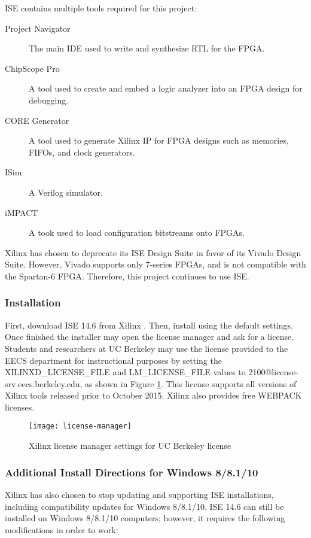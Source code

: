 ISE contains multiple tools required for this project:
\begin{description}
	\item[Project Navigator] The main IDE used to write and synthesize RTL for the FPGA.
	\item[ChipScope Pro] A tool used to create and embed a logic analyzer into an FPGA design for debugging.
	\item[CORE Generator] A tool used to generate Xilinx IP for FPGA designs such as memories, FIFOs, and clock generators.
	\item[ISim] A Verilog simulator.
	\item[iMPACT] A took used to load configuration bitstreams onto FPGAs.
\end{description}

Xilinx has chosen to deprecate its ISE Design Suite in favor of its Vivado Design Suite. However, Vivado supports only 7-series FPGAs, and is not compatible with the Spartan-6 FPGA. Therefore, this project continues to use ISE.

\subsubsection{Installation}
First, download ISE 14.6 from Xilinx \cite{ise-download}. Then, install using the default settings. Once finished the installer may open the license manager and ask for a license. Students and researchers at UC Berkeley may use the license provided to the EECS department for instructional purposes by setting the XILINXD\_LICENSE\_FILE and LM\_LICENSE\_FILE values to 2100@license-srv.eecs.berkeley.edu, as shown in Figure \ref{fig:license-manager}. This license supports all versions of Xilinx tools released prior to October 2015. Xilinx also provides free WEBPACK licenses. %

\begin{figure}
\centering
\texttt{[image: license-manager]}
\caption{Xilinx license manager settings for UC Berkeley license}
\label{fig:license-manager}
\end{figure}

\subsubsection{Additional Install Directions for Windows 8/8.1/10}
Xilinx has also chosen to stop updating and supporting ISE installations, including compatibility updates for Windows 8/8.1/10. ISE 14.6 can still be installed on Windows 8/8.1/10 computers; however, it requires the following modifications \cite{ise-64bit} in order to work:

